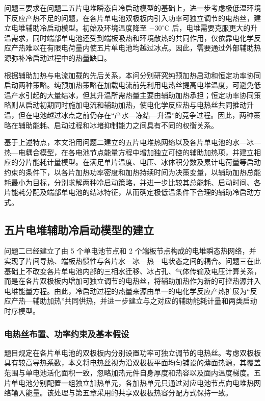 \documentclass[bwprint]{gmcmthesis}
\numberwithin{figure}{section}
\begin{document}
问题三要求在问题二五片电堆瞬态自冷启动模型的基础上，进一步考虑极低温环境下反应产热不足的问题，在各片单电池双极板内引入功率可独立调节的电热丝，建立电堆辅助冷启动模型。初始及环境温度降至 \(-30^\circ\mathrm C\) 后，电堆需要克服更大的升温需求，同时端部单电池还受到端板吸热和环境散热的共同作用，仅依靠电化学反应产热难以在有限电荷量内使五片单电池均越过冰点。因此，需要通过外部辅助热源弥补冷启动过程中的热量缺口。

根据辅助加热与电流加载的先后关系，本问分别研究纯预加热启动和恒定功率协同启动两种策略。纯预加热策略在加载电流前先利用电热丝提高电堆温度，可避免低温产水引起的大量结冰，但其升温所需热量主要由辅助加热承担；恒定功率协同策略则从启动初期同时施加电流和辅助加热，使电化学反应热与电热丝共同推动升温，但在电池越过冰点之前仍存在“产水—冻结—升温”的竞争过程。因此，两种策略在辅助能耗、启动过程和冰堵抑制能力之间具有不同的权衡关系。

基于上述特点，本文沿用问题二建立的五片电堆热网络以及各片单电池的水—冰—热—电耦合模型，在各电池节点能量方程中增加独立可控的辅助加热项，并建立相应的分片能耗计量模型。在满足单片温度、电压、冰体积分数及累计电荷量等启动约束的条件下，以各片加热功率密度和加热持续时间为决策变量，以辅助加热总能耗最小为目标，分别求解两种冷启动策略，并进一步比较其总能耗、启动时间、各片能耗分配及端部单电池的结冰特征，从而确定极低温条件下合理的辅助冷启动方式。

\subsection{五片电堆辅助冷启动模型的建立}

问题二已经建立了由 5 个单电池节点和 2 个端板节点构成的电堆瞬态热网络，并实现了片间导热、端板热惯性与各片水—冰—热—电状态之间的耦合。问题三在此基础上不改变各片单电池内部的三相水迁移、冰占孔、气体传输及电压计算关系，而是在各片双极板内增加可独立调节的电热丝，将辅助加热作为新的可控热源并入电堆能量方程。由此，冷启动过程的热量来源由单一的电化学反应产热扩展为“反应产热—辅助加热”共同供热，并进一步建立与之对应的辅助能耗计量和两类启动时序模型。
\subsubsection{电热丝布置、功率约束及基本假设}
题目规定在各片单电池的双极板内分别设置功率可独立调节的电热丝。考虑双极板具有较高导热系数，本文将电热丝视为沿双极板平面均匀铺设的薄面热源，其覆盖范围与单电池活化面积一致，忽略加热元件自身厚度和热容以及面内温度梯度。五片单电池分别配置一组独立加热单元，各加热单元只通过对应电池节点向电堆热网络输入能量。该处理与第五章采用的共享双极板热容分配方式保持一致。
\end{document}

